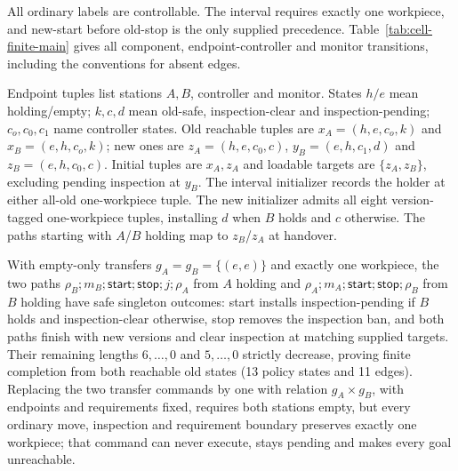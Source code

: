 \label{sec:cell-finite}
All ordinary labels are controllable. The interval requires exactly one workpiece, and new-start before old-stop is the only supplied precedence.
Table~\ref{tab:cell-finite-main} gives all component, endpoint-controller and monitor transitions, including the conventions for absent edges.


Endpoint tuples list stations $A,B$, controller and monitor. States $h/e$ mean holding/empty; $k,c,d$ mean old-safe, inspection-clear and inspection-pending; $c_o,c_0,c_1$ name controller states. Old reachable tuples are $x_A=(h,e,c_o,k)$ and $x_B=(e,h,c_o,k)$; new ones are $z_A=(h,e,c_0,c)$, $y_B=(e,h,c_1,d)$ and $z_B=(e,h,c_0,c)$. Initial tuples are $x_A,z_A$ and loadable targets are $\{z_A,z_B\}$, excluding pending inspection at $y_B$. The interval initializer records the holder at either all-old one-workpiece tuple. The new initializer admits all eight version-tagged one-workpiece tuples, installing $d$ when $B$ holds and $c$ otherwise. The paths starting with $A$/$B$ holding map to $z_B$/$z_A$ at handover.

With empty-only transfers $g_A=g_B=\{(e,e)\}$ and exactly one workpiece, the two paths $\rho_B;m_B;\mathsf{start};\mathsf{stop};j;\rho_A$ from $A$ holding and $\rho_A;m_A;\mathsf{start};\mathsf{stop};\rho_B$ from $B$ holding have safe singleton outcomes: start installs inspection-pending if $B$ holds and inspection-clear otherwise, stop removes the inspection ban, and both paths finish with new versions and clear inspection at matching supplied targets.
Their remaining lengths $6,\ldots,0$ and $5,\ldots,0$ strictly decrease, proving finite completion from both reachable old states (13 policy states and 11 edges).
Replacing the two transfer commands by one with relation $g_A\times g_B$, with endpoints and requirements fixed, requires both stations empty, but every ordinary move, inspection and requirement boundary preserves exactly one workpiece; that command can never execute, stays pending and makes every goal unreachable.


